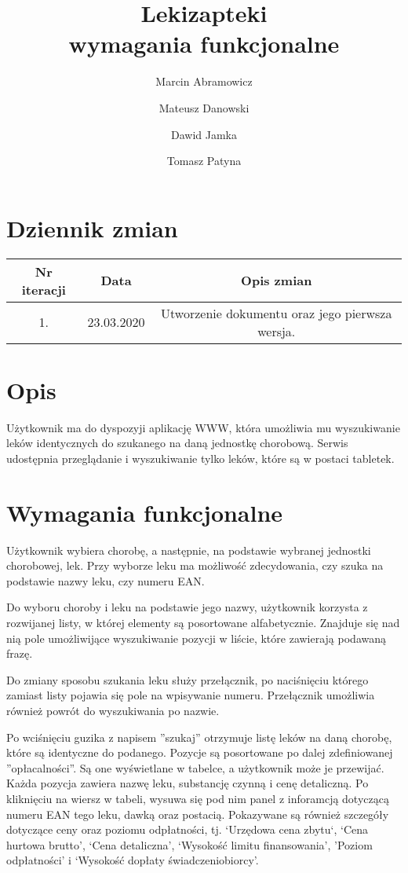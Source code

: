 \documentclass{article}
\title{
Lekizapteki\\
\large wymagania funkcjonalne}
\author{Marcin Abramowicz \and Mateusz Danowski \and Dawid Jamka \and Tomasz Patyna}
\begin{document}
  \maketitle

  \section{Dziennik zmian}
  \begin{tabular}{|c|c|c|}
    Nr iteracji & Data & Opis zmian \\
    \hline
    1. & 23.03.2020 & Utworzenie dokumentu oraz jego pierwsza wersja. \\
  \end{tabular}

  \section{Opis}
  Użytkownik ma do dyspozyji aplikację WWW, która umożliwia mu wyszukiwanie leków identycznych do szukanego na daną jednostkę chorobową.
  Serwis udostępnia przeglądanie i wyszukiwanie tylko leków, które są w postaci tabletek.

  \section{Wymagania funkcjonalne}
  Użytkownik wybiera chorobę, a następnie, na podstawie wybranej jednostki chorobowej, lek.
  Przy wyborze leku ma możliwość zdecydowania, czy szuka na podstawie nazwy leku, czy numeru EAN.

  Do wyboru choroby i leku na podstawie jego nazwy, użytkownik korzysta z rozwijanej listy, w której elementy są posortowane alfabetycznie.
  Znajduje się nad nią pole umożliwijące wyszukiwanie pozycji w liście, które zawierają podawaną frazę.

  Do zmiany sposobu szukania leku służy przełącznik, po naciśnięciu którego zamiast listy pojawia się pole na wpisywanie numeru.
  Przełącznik umożliwia również powrót do wyszukiwania po nazwie.

  Po wciśnięciu guzika z napisem ''szukaj'' otrzymuje listę leków na daną chorobę, które są identyczne do podanego.
  Pozycje są posortowane po dalej zdefiniowanej ''opłacalności''.
  Są one wyświetlane w tabelce, a użytkownik może je przewijać.
  Każda pozycja zawiera nazwę leku, substancję czynną i cenę detaliczną.
  Po kliknięciu na wiersz w tabeli, wysuwa się pod nim panel z inforamcją dotyczącą numeru EAN tego leku, dawką oraz postacią.
  Pokazywane są również szczegóły dotyczące ceny oraz poziomu odpłatności, tj.
  `Urzędowa cena zbytu`,
  `Cena hurtowa brutto',
  `Cena detaliczna',
  `Wysokość limitu finansowania',
  'Poziom odpłatności' i
  `Wysokość dopłaty świadczeniobiorcy'.
\end{document}
